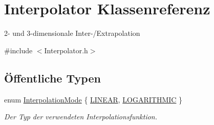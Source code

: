 \hypertarget{classInterpolator}{\section{Interpolator Klassenreferenz}
\label{classInterpolator}
}


2-\/ und 3-\/dimensionale Inter-\//\-Extrapolation  




{\ttfamily \#include $<$Interpolator.\-h$>$}

\subsection*{Öffentliche Typen}
\begin{DoxyCompactItemize}
\item 
enum \hyperlink{classInterpolator_adb733b1439a2903feae57fa734ced0c2}{Interpolation\-Mode} \{ \hyperlink{classInterpolator_adb733b1439a2903feae57fa734ced0c2a3a3f536edbfcc38cea69d59eb5709769}{L\-I\-N\-E\-A\-R}, 
\hyperlink{classInterpolator_adb733b1439a2903feae57fa734ced0c2aa7167350eb8c3b4e2d5cb800587a725b}{L\-O\-G\-A\-R\-I\-T\-H\-M\-I\-C}
 \}
\begin{DoxyCompactList}\small\item\em Der Typ der verwendeten Interpolationsfunktion. \end{DoxyCompactList}\end{DoxyCompactItemize}
